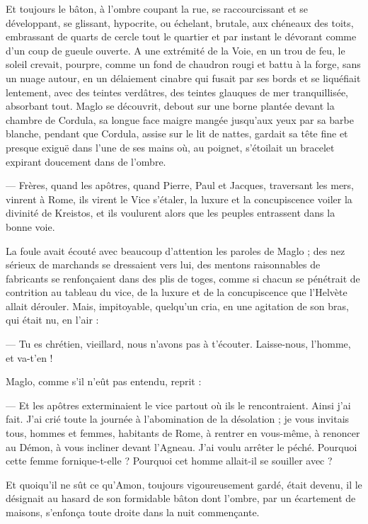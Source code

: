 \documentclass[a4paper, 11pt, oneside, polutonikogreek, french]{article}
\begin{document}
Et toujours le bâton, à l'ombre coupant la rue, se raccourcissant et se développant, se glissant, hypocrite, ou échelant, brutale, aux chéneaux des toits, embrassant de quarts de cercle tout le quartier et par instant le dévorant comme d'un coup de gueule ouverte. A une extrémité de la Voie, en un trou de feu, le soleil crevait, pourpre, comme un fond de chaudron rougi et battu à la forge, sans un nuage autour, en un délaiement cinabre qui fusait par ses bords et se liquéfiait lentement, avec des teintes verdâtres, des teintes glauques de mer tranquillisée, absorbant tout. Maglo se découvrit, debout sur une borne plantée devant la chambre de Cordula, sa longue face maigre mangée jusqu'aux yeux par sa barbe blanche, pendant que Cordula, assise sur le lit de nattes, gardait sa tête fine et presque exiguë dans l'une de ses mains où, au poignet, s'étoilait un bracelet expirant doucement dans de l'ombre.

--- Frères, quand les apôtres, quand Pierre, Paul et Jacques, traversant les mers, vinrent à Rome, ils virent le Vice s'étaler, la luxure et la concupiscence voiler la divinité de Kreistos, et ils voulurent alors que les peuples entrassent dans la bonne voie.

La foule avait écouté avec beaucoup d'attention les paroles de Maglo ; des nez sérieux de marchands se dressaient vers lui, des mentons raisonnables de fabricants se renfonçaient dans des plis de toges, comme si chacun se pénétrait de contrition au tableau du vice, de la luxure et de la concupiscence que l'Helvète allait dérouler. Mais, impitoyable, quelqu'un cria, en une agitation de son bras, qui était nu, en l'air :

--- Tu es chrétien, vieillard, nous n'avons pas à t'écouter. Laisse-nous, l'homme, et va-t'en !

Maglo, comme s'il n'eût pas entendu, reprit :

--- Et les apôtres exterminaient le vice partout où ils le rencontraient. Ainsi j'ai fait. J'ai crié toute la journée à l'abomination de la désolation ; je vous invitais tous, hommes et femmes, habitants de Rome, à rentrer en vous-même, à renoncer au Démon, à vous incliner devant l'Agneau. J'ai voulu arrêter le péché. Pourquoi cette femme fornique-t-elle ? Pourquoi cet homme allait-il se souiller avec ?

Et quoiqu'il ne sût ce qu'Amon, toujours vigoureusement gardé, était devenu, il le désignait au hasard de son formidable bâton dont l'ombre, par un écartement de maisons, s'enfonça toute droite dans la nuit commençante.
\end{document}
